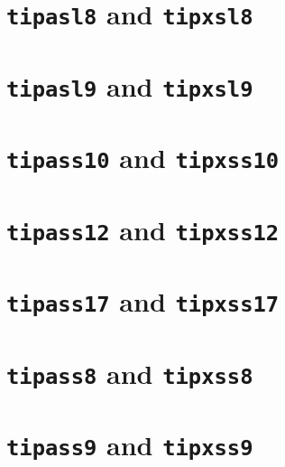 \sampletext{\large\slshape\rmtipa\rmfamily\tipaencoding}

\section{\texttt{tipasl8} and \texttt{tipxsl8}}

\sampletext{\footnotesize\slshape\rmtipa\rmfamily\tipaencoding}

\section{\texttt{tipasl9} and \texttt{tipxsl9}}

\sampletext{\small\slshape\rmtipa\rmfamily\tipaencoding}

\section{\texttt{tipass10} and \texttt{tipxss10}}

\sampletext{\sffamily\rmtipa\rmfamily\tipaencoding}

\section{\texttt{tipass12} and \texttt{tipxss12}}

\sampletext{\large\rmtipa\sffamily\tipaencoding}

\section{\texttt{tipass17} and \texttt{tipxss17}}

\sampletext{\LARGE\rmtipa\sffamily\tipaencoding}

\section{\texttt{tipass8} and \texttt{tipxss8}}

\sampletext{\footnotesize\rmtipa\sffamily\tipaencoding}

\section{\texttt{tipass9} and \texttt{tipxss9}}


